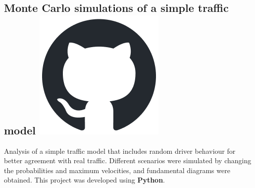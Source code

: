\subsection{Monte Carlo simulations of a simple traffic model
\hspace{0.1 cm} \href{https://github.com/juanjogervasio/Monte-Carlo-traffic-simulation}{\includegraphics[scale=0.2]{github-mark.png}}
}
Analysis of a simple traffic model that includes random driver behaviour for better agreement with real traffic. Different scenarios were simulated by changing the probabilities and maximum velocities, and fundamental diagrams were obtained. This project was developed using \textbf{Python}.

